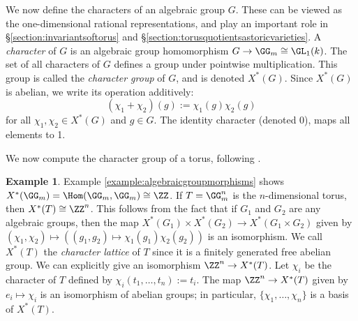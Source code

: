 \documentclass[12pt]{amsart}
\theoremstyle{plain}
\theoremstyle{definition}
\newtheorem{example}[theorem]{Example}
\begin{document}
We now define the characters of an algebraic group $G$.
These can be viewed as the one-dimensional rational representations, and play an important role in \S \ref{section:invariantsoftorus} and \S \ref{section:torusquotientsastoricvarieties}.
A \emph{character} of $G$ is an algebraic group homomorphism $G \to \GG_m \cong \GL_1(k)$.
The set of all characters of $G$ defines a group under pointwise multiplication. 
This group is called the \emph{character group} of $G$, and is denoted $X^*(G)$.
Since $X^*(G)$ is abelian, we write its operation additively:
$$(\chi_1+\chi_2)(g) := \chi_1(g)\chi_2(g)$$
for all $\chi_1, \chi_2 \in X^*(G)$ and $g \in G$.
The identity character (denoted 0), maps all elements to 1.

We now compute the character group of a torus, following \cite[Example 3.1.4]{Geck13}.

\begin{example}
Example \ref{example:algebraicgroupmorphisms} shows $X^*(\GG_m)=\Hom(\GG_m,\GG_m)\cong\ZZ$.
If $T = \GG_m^n$ is the $n$-dimensional torus, then $X^*(T) \cong \ZZ^n$.
This follows from the fact that if $G_1$ and $G_2$ are any algebraic groups, then the map $X^*(G_1)\times X^*(G_2) \to X^*(G_1\times G_2)$ given by $(\chi_1, \chi_2) \mapsto ((g_1, g_2) \mapsto \chi_1(g_1)\chi_2(g_2))$ is an isomorphism.
We call $X^*(T)$ the \emph{character lattice} of $T$ since it is a finitely generated free abelian group.
We can explicitly give an isomorphism $\ZZ^n \to X^*(T)$.
Let $\chi_i$ be the character of $T$ defined by $\chi_i(t_1, \ldots, t_n) := t_i$.
The map $\ZZ^n \to X^*(T)$ given by $e_i \mapsto \chi_i$ is an isomorphism of abelian groups;
in particular, $\{\chi_1, \ldots, \chi_n\}$ is a basis of $X^*(T)$.
\end{example}
\end{document}
